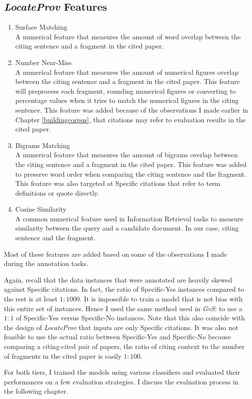 \subsection*{{\it LocateProv} Features}
\begin{enumerate}
\item Surface Matching \\
A numerical feature that measures the amount of word overlap between the citing sentence and a fragment in the cited paper.

\item Number Near-Miss \\
A numerical feature that measures the amount of numerical figures overlap between the citing sentence and a fragment in the cited paper. This feature will preprocess each fragment, rounding numerical figures or converting to percentage values when it tries to match the numerical figures in the citing sentence. This feature was added because of the observations I made earlier in Chapter \ref{buildingcorpus}, that citations may refer to evaluation results in the cited paper.

\item Bigrams Matching \\
A numerical feature that measures the amount of bigrams overlap between the citing sentence and a fragment in the cited paper. This feature was added to preserve word order when comparing the citing sentence and the fragment. This feature was also targeted at Specific citations that refer to term definitions or quote directly.

\item Cosine Similarity \\
A common numerical feature used in Information Retrieval tasks to measure similarity between the query and a candidate document. In our case, citing sentence and the fragment.
\end{enumerate}
Most of these features are added based on some of the observations I made during the annotation tasks.

Again, recall that the data instances that were annotated are heavily skewed against Specific citations. In fact, the ratio of Specific-Yes instances compared to the rest is at least $1:1000$. It is impossible to train a model that is not bias with this entire set of instances. Hence I used the same method used in {\it GvS}: to use a $1:1$ of Specific-Yes versus Specific-No instances. Note that this also coincide with the design of {\it LocateProv} that inputs are only Specific citations. It was also not feasible to use the actual ratio between Specific-Yes and Specific-No because comparing a citing-cited pair of papers, the ratio of citing context to the number of fragments in the cited paper is easily $1:100$.

For both tiers, I trained the models using various classifiers and evaluated their performances on a few evaluation strategies. I discuss the evaluation process in the following chapter.